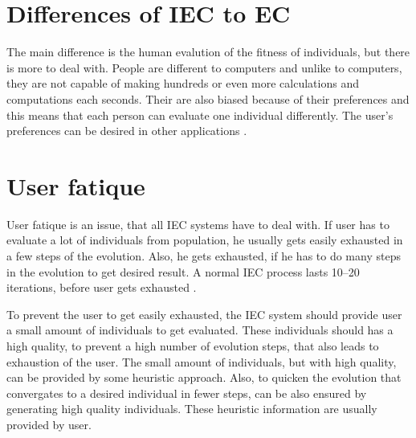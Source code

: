 \section{Differences of IEC to EC}
The main difference is the human evalution of the fitness of individuals, but there is more to deal with. People are different to computers and unlike to computers, they are not capable of making hundreds or even more calculations and computations each seconds. Their are also biased because of their preferences and this means that each person can evaluate one individual differently. The user's preferences can be desired in other applications \cite{tagakipaper}.
\section{User fatique}
User fatique is an issue, that all IEC systems have to deal with. If user has to evaluate a lot of individuals from population, he usually gets easily exhausted in a few steps of the evolution. Also, he gets exhausted, if he has to do many steps in the evolution to get desired result. A normal IEC process lasts 10--20 iterations, before user gets exhausted \cite{tagakipaper}.

To prevent the user to get easily exhausted, the IEC system should provide user a small amount of individuals to get evaluated. These individuals should has a high quality, to prevent a high number of evolution steps, that also leads to exhaustion of the user. The small amount of individuals, but with high quality, can be provided by some heuristic approach. Also, to quicken the evolution that convergates to a desired individual in fewer steps, can be also ensured by generating high quality individuals. These heuristic information are usually provided by user.
